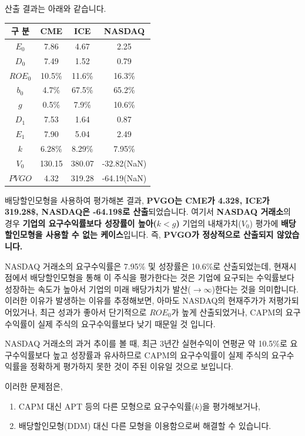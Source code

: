 \documentclass[
  letterpaper,
  DIV=11,
  numbers=noendperiod]{scrreprt}
\begin{document}
산출 결과는 아래와 같습니다.

\begin{longtable}[]{@{}cccc@{}}
\toprule\noalign{}
구 분 & CME & ICE & NASDAQ \\
\midrule\noalign{}
\endhead
\bottomrule\noalign{}
\endlastfoot
\(E_0\) & 7.86 & 4.67 & 2.25 \\
\(D_0\) & 7.49 & 1.52 & 0.79 \\
\(ROE_0\) & 10.5\% & 11.6\% & 16.3\% \\
\(b_0\) & 4.7\% & 67.5\% & 65.2\% \\
\(g\) & 0.5\% & 7.9\% & 10.6\% \\
\(D_1\) & 7.53 & 1.64 & 0.87 \\
\(E_1\) & 7.90 & 5.04 & 2.49 \\
\(k\) & 6.28\% & 8.29\% & 7.95\% \\
\(V_0\) & 130.15 & 380.07 & -32.82(NaN) \\
\(PVGO\) & 4.32 & 319.28 & -64.19(NaN) \\
\end{longtable}

배당할인모형을 사용하여 평가해본 결과, \textbf{PVGO는 CME가 4.32\$,
ICE가 319.28\$, NASDAQ은 -64.19\$로 산출}되었습니다. 여기서
\textbf{NASDAQ 거래소}의 경우 \textbf{기업의 요구수익률보다 성장률이
높아(\(k<g\))} 기업의 내채가치(\(V_0\)) 평가에 \textbf{배당할인모형을
사용할 수 없는 케이스}입니다. 즉, \textbf{PVGO가 정상적으로 산출되지
않았습니다.}

NASDAQ 거래소의 요구수익률은 7.95\% 및 성장률은 10.6\%로 산출되었는데,
현재시점에서 배당할인모형을 통해 이 주식을 평가한다는 것은 기업에
요구되는 수익률보다 성장하는 속도가 높아서 기업의 미래 배당가치가
발산(\(\rightarrow\infty\))한다는 것을 의미합니다. 이러한 이유가
발생하는 이유를 추정해보면, 아마도 NASDAQ의 현재주가가 저평가되어있거나,
최근 성과가 좋아서 단기적으로 \(ROE_0\)가 높게 산출되었거나, CAPM의
요구수익률이 실제 주식의 요구수익률보다 낮기 때문일 것 입니다.

NASDAQ 거래소의 과거 추이를 볼 때, 최근 3년간 실현수익이 연평균 약
10.5\%로 요구수익률보다 높고 성장률과 유사하므로 CAPM의 요구수익률이
실제 주식의 요구수익률을 정확하게 평가하지 못한 것이 주된 이유일 것으로
보입니다.

이러한 문제점은,

\begin{enumerate}
\def\labelenumi{(\arabic{enumi})}
\item
  CAPM 대신 APT 등의 다른 모형으로 요구수익률(\(k\))을 평가해보거나,
\item
  배당할인모형(DDM) 대신 다른 모형을 이용함으로써 해결할 수 있습니다.
\end{enumerate}
\end{document}
